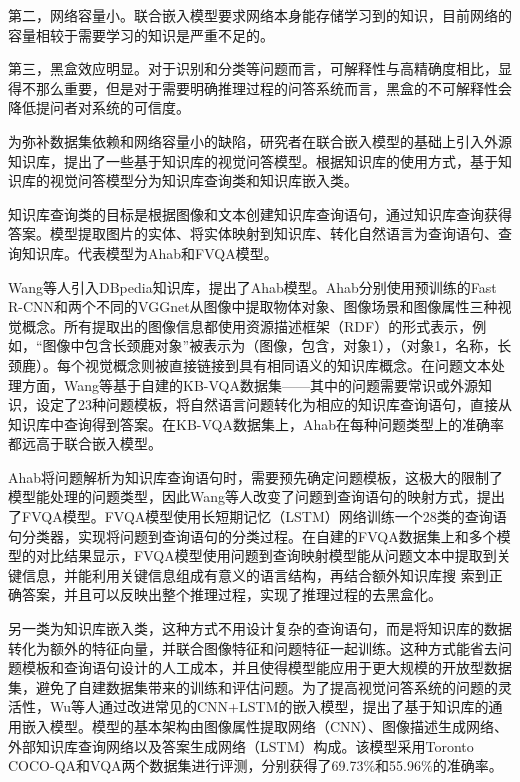 第二，网络容量小。联合嵌入模型要求网络本身能存储学习到的知识，目前网络的容量相较于需要学习的知识是严重不足的。

第三，黑盒效应明显。对于识别和分类等问题而言，可解释性与高精确度相比，显得不那么重要，但是对于需要明确推理过程的问答系统而言，黑盒的不可解释性会降低提问者对系统的可信度。

为弥补数据集依赖和网络容量小的缺陷，研究者在联合嵌入模型的基础上引入外源知识库，提出了一些基于知识库的视觉问答模型。根据知识库的使用方式，基于知识库的视觉问答模型分为知识库查询类和知识库嵌入类。

知识库查询类的目标是根据图像和文本创建知识库查询语句，通过知识库查询获得答案。模型提取图片的实体、将实体映射到知识库、转化自然语言为查询语句、查询知识库。代表模型为Ahab和FVQA模型。

Wang等人引入DBpedia知识库，提出了Ahab模型。Ahab分别使用预训练的Fast R-CNN和两个不同的VGGnet从图像中提取物体对象、图像场景和图像属性三种视觉概念。所有提取出的图像信息都使用资源描述框架（RDF）的形式表示，例如，“图像中包含长颈鹿对象”被表示为（图像，包含，对象1），（对象1，名称，长颈鹿）。每个视觉概念则被直接链接到具有相同语义的知识库概念。在问题文本处理方面，Wang等基于自建的KB-VQA数据集——其中的问题需要常识或外源知识，设定了23种问题模板，将自然语言问题转化为相应的知识库查询语句，直接从知识库中查询得到答案。在KB-VQA数据集上，Ahab在每种问题类型上的准确率都远高于联合嵌入模型。

Ahab将问题解析为知识库查询语句时，需要预先确定问题模板，这极大的限制了模型能处理的问题类型，因此Wang等人改变了问题到查询语句的映射方式，提出了FVQA模型。FVQA模型使用长短期记忆（LSTM）网络训练一个28类的查询语句分类器，实现将问题到查询语句的分类过程。在自建的FVQA数据集上和多个模型的对比结果显示，FVQA模型使用问题到查询映射模型能从问题文本中提取到关键信息，并能利用关键信息组成有意义的语言结构，再结合额外知识库搜
索到正确答案，并且可以反映出整个推理过程，实现了推理过程的去黑盒化。

另一类为知识库嵌入类，这种方式不用设计复杂的查询语句，而是将知识库的数据转化为额外的特征向量，并联合图像特征和问题特征一起训练。这种方式能省去问题模板和查询语句设计的人工成本，并且使得模型能应用于更大规模的开放型数据集，避免了自建数据集带来的训练和评估问题。为了提高视觉问答系统的问题的灵活性，Wu等人通过改进常见的CNN+LSTM的嵌入模型，提出了基于知识库的通用嵌入模型。模型的基本架构由图像属性提取网络（CNN）、图像描述生成网络、外部知识库查询网络以及答案生成网络（LSTM）构成。该模型采用Toronto COCO-QA和VQA两个数据集进行评测，分别获得了69.73\%和55.96\%的准确率。

